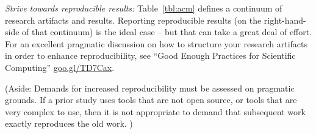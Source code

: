 \documentclass[preprint,10pt]{elsarticle}
\newcommand{\RED}{\color{red}}
\newcommand{\BLACK}{\color{black}}
\begin{document}
{\em Strive towards reproducible results:}
Table~\ref{tbl:acm} defines a continuum of research artifacts and results.  Reporting reproducible results (on the right-hand-side of that continuum) is the ideal case -- but that can take a great deal of effort.  
For an excellent pragmatic discussion on how to structure your research artifacts in order to enhance reproducibility, see ``Good Enough Practices for Scientific Computing''  \href{http://goo.gl/TD7Cax}{goo.gl/TD7Cax}.

\RED(Aside: Demands for increased reproducibility must be assessed on pragmatic grounds.  If a prior study uses tools that are not open source, or tools that are very complex to use, then it is not appropriate to demand that subsequent work exactly reproduces the old work. )\label{noreprod} \BLACK
\end{document}
